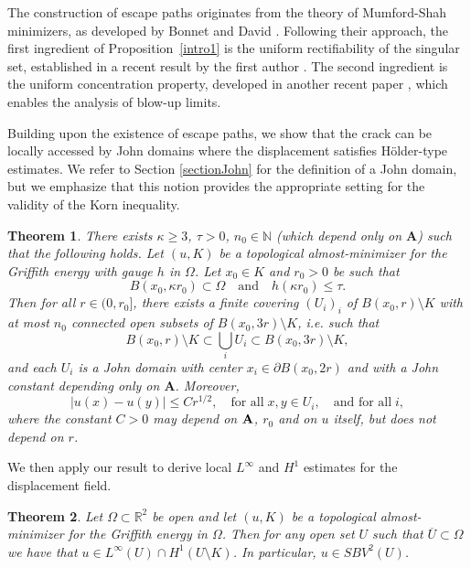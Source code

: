 \documentclass[12pt]{article}
\newtheorem{theorem}{Theorem}[section]
\theoremstyle{definition}
\theoremstyle{remark}
\numberwithin{equation}{section}
\newcommand{\R}{\mathbb{R}}
\newcommand{\N}{\mathbb{N}}
\newcommand{\A}{\mathbf{A}}
\begin{document}
The construction of escape paths originates from the theory of Mumford-Shah minimizers, as developed by Bonnet and David
\cite{bonnetDavid}. Following their approach, the first ingredient of Proposition~\ref{intro1}  is the uniform
rectifiability of the singular set, established in a recent result by the first author \cite{camilleUR}. The second
ingredient is the uniform concentration property, developed in another recent paper \cite{lablem}, which enables the
analysis of blow-up limits.

Building upon the existence of escape paths, we show that the crack can be locally accessed by John domains where the
displacement satisfies Hölder-type estimates.
We refer to Section \ref{sectionJohn} for the definition of a John domain, but we emphasize that this notion provides the appropriate setting for the validity of the Korn inequality.

\begin{theorem}\label{main0}
    There exists $\kappa \geq 3$, $\tau > 0$, $n_0 \in \N$ (which depend only on $\A$) such that the following holds.
    Let $(u,K)$ be a topological almost-minimizer for the Griffith energy with gauge $h$ in $\Omega$.
    Let $x_0 \in K$ and $r_0 > 0$ be such that
    \begin{equation*}
        B(x_0,\kappa r_0) \subset \Omega \quad \text{and} \quad h(\kappa r_0) \leq \tau.
    \end{equation*}
    Then   for all $r \in (0,r_0]$,
    there exists a finite covering $(U_i)_i$ of $B(x_0,r)\setminus K$ with at most $n_0$ connected open subsets of $B(x_0,3r) \setminus K$, i.e.  such that
    \begin{equation}
        B(x_0,r)\setminus K\subset \bigcup_i U_i\subset B(x_0,3r)\setminus K,
    \end{equation}
    and each $U_i$ is a John domain with center $x_i\in \partial B(x_0,2r)$ and with a John constant depending only on $\A$. Moreover, 
    \begin{equation*}
        |u(x)-u(y)|\leq Cr^{1/2},\quad \text{for all} \; x,y\in U_i,\quad \text{and for all} \; i,
    \end{equation*}
    where the constant $C>0$  may depend on $\bf A$, $r_0$ and on  $u$ itself, but does not depend on $r$.
\end{theorem}

We then apply our result to derive local $L^\infty$ and $H^1$ estimates for the displacement field.

\begin{theorem}\label{main1}
    Let $\Omega \subset \R^2$ be open and let $(u,K)$ be a topological almost-minimizer for the Griffith energy in $\Omega$. Then
    for any open set $U$ such that $\overline{U}\subset \Omega$ we have that $u\in L^{\infty}(U)\cap H^1 (U\setminus
    K)$. In particular, $u\in SBV^2(U)$.
\end{theorem}
\end{document}
